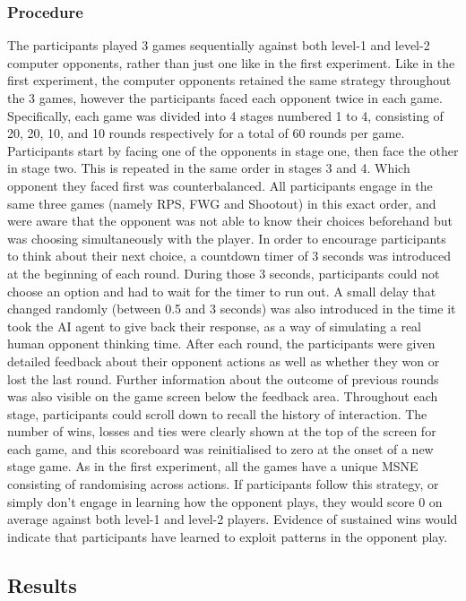 \documentclass[man,floatsintext]{apa6}
\begin{document}
\hypertarget{procedure-1}{%
\subsubsection{Procedure}\label{procedure-1}}

The participants played 3 games sequentially against both level-1 and level-2 computer opponents, rather than just one like in the first experiment. Like in the first experiment, the computer opponents retained the same strategy throughout the 3 games, however the participants faced each opponent twice in each game. Specifically, each game was divided into 4 stages numbered 1 to 4, consisting of 20, 20, 10, and 10 rounds respectively for a total of 60 rounds per game. Participants start by facing one of the opponents in stage one, then face the other in stage two. This is repeated in the same order in stages 3 and 4. Which opponent they faced first was counterbalanced. All participants engage in the same three games (namely RPS, FWG and Shootout) in this exact order, and were aware that the opponent was not able to know their choices beforehand but was choosing simultaneously with the player.
In order to encourage participants to think about their next choice, a countdown timer of 3 seconds was introduced at the beginning of each round. During those 3 seconds, participants could not choose an option and had to wait for the timer to run out. A small delay that changed randomly (between 0.5 and 3 seconds) was also introduced in the time it took the AI agent to give back their response, as a way of simulating a real human opponent thinking time. After each round, the participants were given detailed feedback about their opponent actions as well as whether they won or lost the last round. Further information about the outcome of previous rounds was also visible on the game screen below the feedback area. Throughout each stage, participants could scroll down to recall the history of interaction. The number of wins, losses and ties were clearly shown at the top of the screen for each game, and this scoreboard was reinitialised to zero at the onset of a new stage game.
As in the first experiment, all the games have a unique MSNE consisting of randomising across actions. If participants follow this strategy, or simply don't engage in learning how the opponent plays, they would score 0 on average against both level-1 and level-2 players. Evidence of sustained wins would indicate that participants have learned to exploit patterns in the opponent play.

\hypertarget{results-1}{%
\subsection{Results}\label{results-1}}
\end{document}
